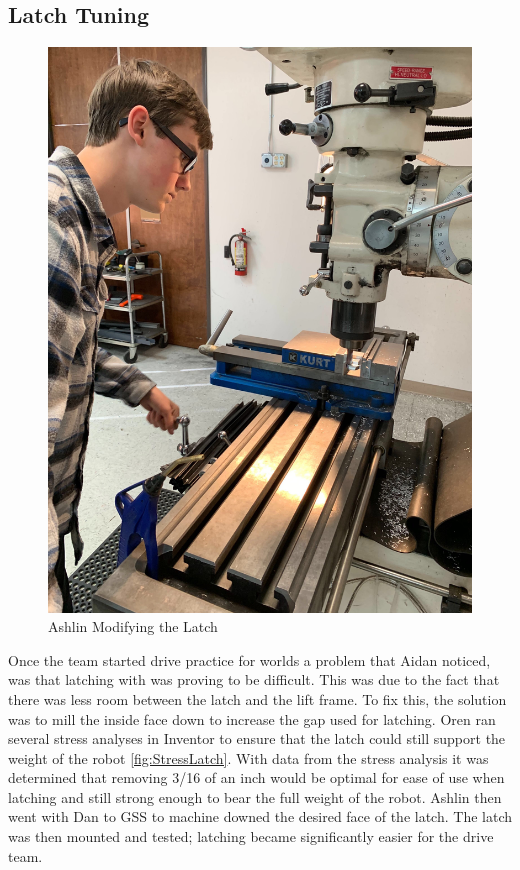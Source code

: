\documentclass{article}
\begin{document}
\subsection{Latch Tuning}
\begin{figure}
    \centering
    \includegraphics[width= 0.5 \textwidth]{32_04-08/images/ashlinmachining.jpg}
    \caption{Ashlin Modifying the Latch}
    \label{fig:latch}
\end{figure}
Once the team started drive practice for worlds a problem that Aidan noticed, was that latching with was proving to be difficult. This was due to the fact that there was less room between the latch and the lift frame. To fix this, the solution was to mill the inside face down to increase the gap used for latching. Oren ran several stress analyses in Inventor to ensure that the latch could still support the weight of the robot \ref{fig:StressLatch}. With data from the stress analysis it was determined that removing 3/16 of an inch would be optimal for ease of use when latching and still strong enough to bear the full weight of the robot. Ashlin then went with Dan to GSS to machine downed the desired face of the latch. The latch was then mounted and tested; latching became significantly easier for the drive team.  
\end{document}
